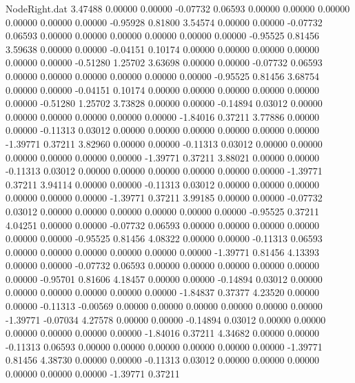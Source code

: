 \begin{filecontents}{NodeRight.dat}
   3.47488    0.00000    0.00000    -0.07732    0.06593    0.00000    0.00000    0.00000    0.00000    0.00000    0.00000   -0.95928    0.81800
   3.54574    0.00000    0.00000    -0.07732    0.06593    0.00000    0.00000    0.00000    0.00000    0.00000    0.00000   -0.95525    0.81456
   3.59638    0.00000    0.00000    -0.04151    0.10174    0.00000    0.00000    0.00000    0.00000    0.00000    0.00000   -0.51280    1.25702
   3.63698    0.00000    0.00000    -0.07732    0.06593    0.00000    0.00000    0.00000    0.00000    0.00000    0.00000   -0.95525    0.81456
   3.68754    0.00000    0.00000    -0.04151    0.10174    0.00000    0.00000    0.00000    0.00000    0.00000    0.00000   -0.51280    1.25702
   3.73828    0.00000    0.00000    -0.14894    0.03012    0.00000    0.00000    0.00000    0.00000    0.00000    0.00000   -1.84016    0.37211
   3.77886    0.00000    0.00000    -0.11313    0.03012    0.00000    0.00000    0.00000    0.00000    0.00000    0.00000   -1.39771    0.37211
   3.82960    0.00000    0.00000    -0.11313    0.03012    0.00000    0.00000    0.00000    0.00000    0.00000    0.00000   -1.39771    0.37211
   3.88021    0.00000    0.00000    -0.11313    0.03012    0.00000    0.00000    0.00000    0.00000    0.00000    0.00000   -1.39771    0.37211
   3.94114    0.00000    0.00000    -0.11313    0.03012    0.00000    0.00000    0.00000    0.00000    0.00000    0.00000   -1.39771    0.37211
   3.99185    0.00000    0.00000    -0.07732    0.03012    0.00000    0.00000    0.00000    0.00000    0.00000    0.00000   -0.95525    0.37211
   4.04251    0.00000    0.00000    -0.07732    0.06593    0.00000    0.00000    0.00000    0.00000    0.00000    0.00000   -0.95525    0.81456
   4.08322    0.00000    0.00000    -0.11313    0.06593    0.00000    0.00000    0.00000    0.00000    0.00000    0.00000   -1.39771    0.81456
   4.13393    0.00000    0.00000    -0.07732    0.06593    0.00000    0.00000    0.00000    0.00000    0.00000    0.00000   -0.95701    0.81606
   4.18457    0.00000    0.00000    -0.14894    0.03012    0.00000    0.00000    0.00000    0.00000    0.00000    0.00000   -1.84837    0.37377
   4.23520    0.00000    0.00000    -0.11313   -0.00569    0.00000    0.00000    0.00000    0.00000    0.00000    0.00000   -1.39771   -0.07034
   4.27578    0.00000    0.00000    -0.14894    0.03012    0.00000    0.00000    0.00000    0.00000    0.00000    0.00000   -1.84016    0.37211
   4.34682    0.00000    0.00000    -0.11313    0.06593    0.00000    0.00000    0.00000    0.00000    0.00000    0.00000   -1.39771    0.81456
   4.38730    0.00000    0.00000    -0.11313    0.03012    0.00000    0.00000    0.00000    0.00000    0.00000    0.00000   -1.39771    0.37211

\end{filecontents}
